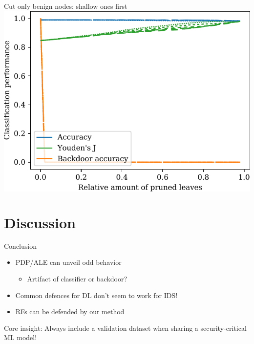 \documentclass[xcolor={dvipsnames}]{beamer}
\begin{document}
\begin{frame}{Cut only benign nodes; shallow ones first}
\centering
\includegraphics[width=0.9\columnwidth]{figures/prune_CAIA_backdoor_15/prune_oh_d.pdf}
\end{frame}

\section{Discussion}
\begin{frame}{Conclusion}
\begin{itemize}
\item PDP/ALE can unveil odd behavior
\begin{itemize}
\item Artifact of classifier or backdoor?
\end{itemize}
\item Common defences for DL don't seem to work for IDS!
\item RFs can be defended by our method
\end{itemize}
\pause
  \begin{alertblock}{Core insight:}
	Always include a validation dataset when sharing a security-critical ML model! 
  \end{alertblock}
\end{frame}

\makelastslide
\end{document}
